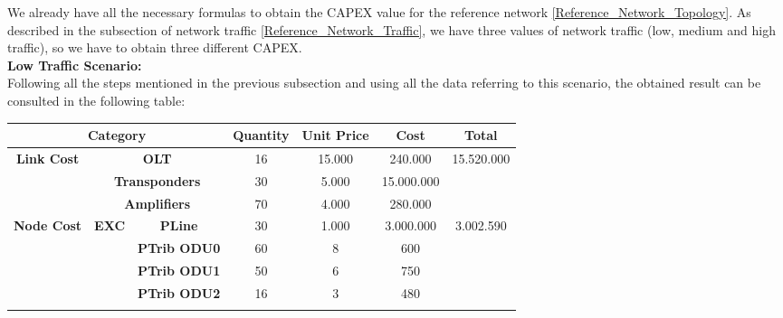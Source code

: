 We already have all the necessary formulas to obtain the CAPEX value for the reference network \ref{Reference_Network_Topology}. As described in the subsection of network traffic \ref{Reference_Network_Traffic}, we have three values of network traffic (low, medium and high traffic), so we have to obtain three different CAPEX.\\

\textbf{Low Traffic Scenario:}\\

Following all the steps mentioned in the previous subsection and using all the data referring to this scenario, the obtained result can be consulted in the following table:

\begin{table}[H]
\centering
\label{opaque_low_traffic_protec}
\begin{tabular}{|c|c|c|c|c|c|c|}
\hline
\multicolumn{3}{|c|}{\textbf{Category}}                                                   & \textbf{Quantity} & \textbf{Unit Price} & \textbf{Cost} & \textbf{Total}              \\ \hline
\multirow{3}{*}{\textbf{Link Cost}} & \multicolumn{2}{c|}{\textbf{OLT}}                   & 16                & 15.000              & 240.000       & \multirow{3}{*}{15.520.000} \\ \cline{2-6}
                                    & \multicolumn{2}{c|}{\textbf{Transponders}}          & 30                & 5.000               & 15.000.000    &                             \\ \cline{2-6}
                                    & \multicolumn{2}{c|}{\textbf{Amplifiers}}            & 70                & 4.000               & 280.000       &                             \\ \hline
\multirow{8}{*}{\textbf{Node Cost}} & \multirow{6}{*}{\textbf{EXC}} & \textbf{PLine}      & 30                & 1.000               & 3.000.000     & \multirow{8}{*}{3.002.590}  \\ \cline{3-6}
                                    &                               & \textbf{PTrib ODU0} & 60                & 8                   & 600           &                             \\ \cline{3-6}
                                    &                               & \textbf{PTrib ODU1} & 50                & 6                   & 750           &                             \\ \cline{3-6}
                                    &                               & \textbf{PTrib ODU2} & 16                & 3                   & 480           &                             \\ \cline{3-6}

\end{tabular}
\end{table}
